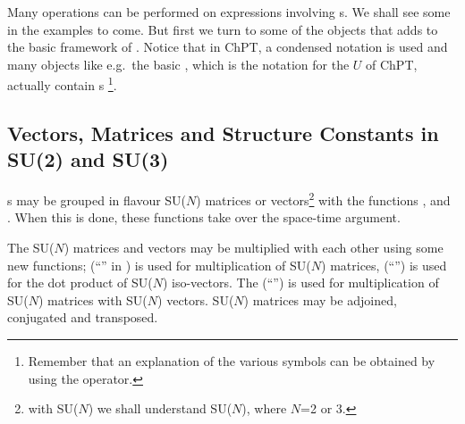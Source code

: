 Many operations can be performed on expressions involving s. We shall see some in
the examples to come. But first we turn to some of the objects that \fphi adds to the basic
framework of \fc. Notice that in ChPT, a condensed notation is used and many objects like e.g.~the
basic , which is the \fphi notation for the $U$ of ChPT, actually contain
s \footnote{Remember that an explanation of the various symbols can be obtained
by using the  operator.}.

\subsection{Vectors, Matrices and Structure Constants in SU(2) and SU(3)}

s may be grouped in flavour SU($N$) matrices or vectors\footnote{with SU($N$) we shall understand  SU($N$), where $N$=2 or 3.} with the functions ,  and . When this is done, these functions take over the space-time argument.



The SU($N$) matrices and vectors may be multiplied with each other using some new functions;  (``\mb{$\SixPointedStar$}'' in ) is used for multiplication of SU($N$) matrices,  (``\mb{$\cdot$}'') is used for the dot product of SU($N$) iso-vectors. The \mma {} (``'') is used for multiplication of SU($N$) matrices with SU($N$) vectors. SU($N$) matrices may be adjoined, conjugated and transposed.

\beom
{}
\enom

